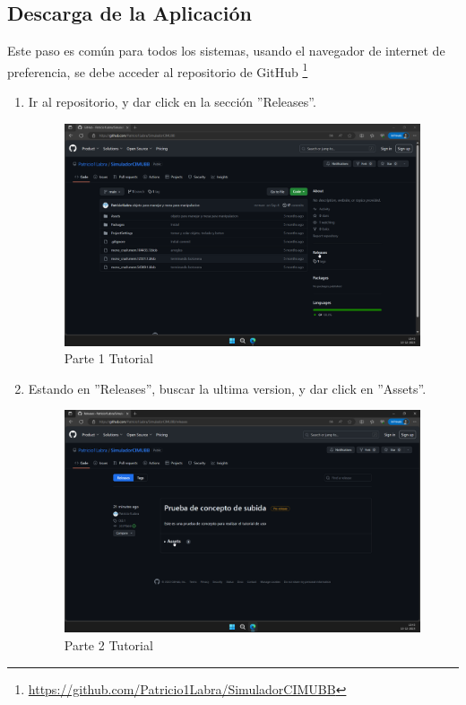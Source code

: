\subsection*{Descarga de la Aplicación}
Este paso es común para todos los sistemas, usando el navegador de internet de preferencia, se debe acceder al repositorio de GitHub \footnote{\url{https://github.com/Patricio1Labra/SimuladorCIMUBB}}
\begin{enumerate}[label=\arabic*.-]
    \item Ir al repositorio, y dar click en la sección ''Releases''.
\begin{figure}[ht]
    \centering
    \includegraphics[width=10.5cm]{figures/TutorialWindows/tutorial (1).png}
    \caption{Parte 1 Tutorial}
    \label{fig:tuto1}
\end{figure}

\clearpage
    \item Estando en ''Releases'', buscar la ultima version, y dar click en ''Assets''.
\begin{figure}[ht]
    \centering
    \includegraphics[width=10.5cm]{figures/TutorialWindows/tutorial (2).png}
    \caption{Parte 2 Tutorial}
    \label{fig:tuto2}
\end{figure}


\end{enumerate}
